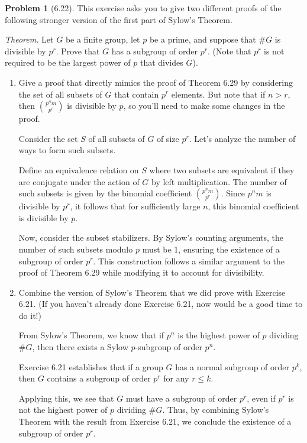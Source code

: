 \documentclass[12pt]{article}
\theoremstyle{definition}
\newtheorem{problem}{Problem}
\begin{document}
\begin{problem}[6.22]
    This exercise asks you to give two different proofs of the following stronger version of the first part of Sylow's Theorem.

    \textit{Theorem.} Let $G$ be a finite group, let $p$ be a prime, and suppose that $\#G$ is divisible by $p^r$. Prove that $G$
    has a subgroup of order $p^r$. (Note that $p^r$ is not required to be the largest power of $p$ that divides $G$).
    \begin{enumerate}[label=(\alph*)]
        \item Give a proof that directly mimics the proof of Theorem 6.29 by considering the set of all subsets of $G$ that contain $p^r$ elements.
              But note that if $n > r$, then ${p^nm}\choose{p^r}$ is divisible by $p$, so you'll need to make some changes in the proof.

        \begin{solution}
        Consider the set $S$ of all subsets of $G$ of size $p^r$. Let's analyze the number of ways to form such subsets.
        
        Define an equivalence relation on $S$ where two subsets are equivalent if they are conjugate under the action of $G$ by left multiplication. The number of such subsets is given by the binomial coefficient $\binom{p^n m}{p^r}$. Since $p^n m$ is divisible by $p^r$, it follows that for sufficiently large $n$, this binomial coefficient is divisible by $p$.
        
        Now, consider the subset stabilizers. By Sylow's counting arguments, the number of such subsets modulo $p$ must be 1, ensuring the existence of a subgroup of order $p^r$. This construction follows a similar argument to the proof of Theorem 6.29 while modifying it to account for divisibility.
        \end{solution}

        \item Combine the version of Sylow's Theorem that we did prove with Exercise 6.21. (If you haven't already done Exercise 6.21, now
              would be a good time to do it!)

        \begin{solution}
        From Sylow's Theorem, we know that if $p^n$ is the highest power of $p$ dividing $\#G$, then there exists a Sylow $p$-subgroup of order $p^n$.
        
        Exercise 6.21 establishes that if a group $G$ has a normal subgroup of order $p^k$, then $G$ contains a subgroup of order $p^r$ for any $r \leq k$.
        
        Applying this, we see that $G$ must have a subgroup of order $p^r$, even if $p^r$ is not the highest power of $p$ dividing $\#G$. Thus, by combining Sylow's Theorem with the result from Exercise 6.21, we conclude the existence of a subgroup of order $p^r$.
        \end{solution}
    \end{enumerate}
\end{problem}
\end{document}
